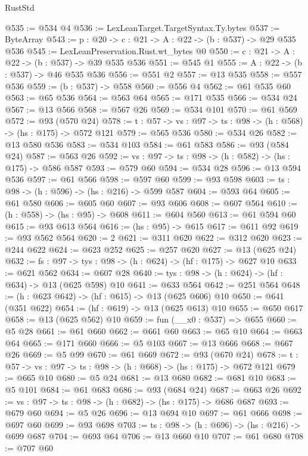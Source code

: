 \begin{lexlean}{RustStd}
\begin{coremodule}
@535 := @534 @4
@536 := LexLeanTarget.TargetSyntax.Ty.bytes
@537 := ByteArray
@543 := {p : @20} -> {c : @21} -> {A : @22} -> (b : @537) -> @29 @535 @536
@545 := LexLeanPreservation.Rust.wt_bytes @0
@550 := {c : @21} -> {A : @22} -> (b : @537) -> @39 @535 @536
@551 := @545 @1
@555 := {A : @22} -> (b : @537) -> @46 @535 @536
@556 := @551 @2
@557 := @13 @535
@558 := @557 @536
@559 := (b : @537) -> @558
@560 := @556 @4
@562 := @61 @535 @60
@563 := @65 @536
@564 := @563 @64
@565 := @171 @535
@566 := @534 @24
@567 := @13 @566
@568 := @567 @26
@569 := @534 @101
@570 := @61 @569
@572 := @93 (@570 @24)
@578 := {t : @57} -> {vs : @97} -> {ts : @98} -> (h : @568) -> (hs : @175) -> @572 @121
@579 := @565 @536
@580 := @534 @26
@582 := @13 @580 @536
@583 := @534 @103
@584 := @61 @583
@586 := @93 (@584 @24)
@587 := @563 @26
@592 := {vs : @97} -> {ts : @98} -> (h : @582) -> (hs : @175) -> @586 @587
@593 := @579 @60
@594 := @534 @28
@596 := @13 @594 @536
@597 := @61 @566
@598 := @597 @60
@599 := @93 @598
@603 := {ts : @98} -> (h : @596) -> (hs : @216) -> @599 @587
@604 := @593 @64
@605 := @61 @580
@606 := @605 @60
@607 := @93 @606
@608 := @607 @564
@610 := (h : @558) -> (hs : @95) -> @608
@611 := @604 @560
@613 := @61 @594 @60
@615 := @93 @613 @564
@616 := (hs : @95) -> @615
@617 := @611 @92
@619 := @93 @562 @564
@620 := 2
@621 := @311 @620
@622 := @312 @620
@623 := @244 @622
@624 := @623 @252
@625 := @257 @620
@627 := @13 (@625 @24)
@632 := {fs : @97} -> {tys : @98} -> (h : @624) -> (hf : @175) -> @627 @10
@633 := @621 @562
@634 := @607 @28
@640 := {tys : @98} -> (h : @624) -> (hf : @634) -> @13 (@625 @598) @10
@641 := @633 @564
@642 := @251 @564
@648 := (h : @623 @642) -> (hf : @615) -> @13 (@625 @606) @10
@650 := @641 (@351 @622)
@654 := (hf : @619) -> @13 (@625 @613) @10
@655 := @650 @617
@658 := @13 (@625 @562) @10
@659 := fun (__x0 : @537) => @655
@660 := @5 @28
@661 := @61 @660
@662 := @661 @60
@663 := @65 @10
@664 := @663 @64
@665 := @171 @660
@666 := @5 @103
@667 := @13 @666
@668 := @667 @26
@669 := @5 @99
@670 := @61 @669
@672 := @93 (@670 @24)
@678 := {t : @57} -> {vs : @97} -> {ts : @98} -> (h : @668) -> (hs : @175) -> @672 @121
@679 := @665 @10
@680 := @5 @24
@681 := @13 @680
@682 := @681 @10
@683 := @5 @101
@684 := @61 @683
@686 := @93 (@684 @24)
@687 := @663 @26
@692 := {vs : @97} -> {ts : @98} -> (h : @682) -> (hs : @175) -> @686 @687
@693 := @679 @60
@694 := @5 @26
@696 := @13 @694 @10
@697 := @61 @666
@698 := @697 @60
@699 := @93 @698
@703 := {ts : @98} -> (h : @696) -> (hs : @216) -> @699 @687
@704 := @693 @64
@706 := @13 @660 @10
@707 := @61 @680
@708 := @707 @60

\end{coremodule}
\end{lexlean}
